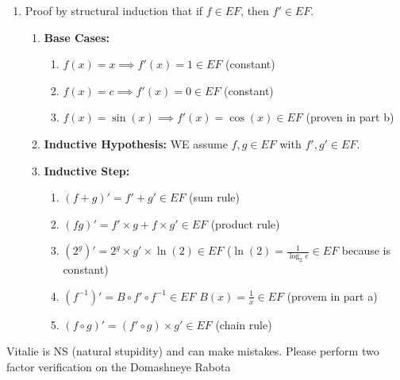 \documentclass[12pt]{article}
\begin{document}
\begin{enumerate}[label=\alph*)]
    \item Proof by structural induction that if \(f \in EF\), then \(f' \in EF\).
    \begin{enumerate}[label=\arabic*.]
        \item \textbf{Base Cases:}
        \begin{enumerate}[label=\roman*.]
            \item \(f(x) = x \implies f'(x) = 1 \in EF\) (constant)
            \item \(f(x) = c \implies f'(x) = 0 \in EF\) (constant)
            \item \(f(x) = \sin(x) \implies f'(x) = \cos(x) \in EF\) (proven in part b)
        \end{enumerate}
        \item \textbf{Inductive Hypothesis:} WE assume \(f, g \in EF\) with \(f', g' \in EF\).
        \item \textbf{Inductive Step:}
        \begin{enumerate}[label=\roman*.]
            \item \((f + g)' = f' + g' \in EF\) (sum rule)
            \item \((fg)' = f' \times g + f \times g' \in EF\) (product rule)
            \item \((2^g)' = 2^g \times g' \times \ln(2) \in EF\) (\(\ln(2) = \frac{1}{\log_2{e}} \in EF\) because is constant)
            \item \((f^{-1})' = B \circ f' \circ f^{-1} \in EF\)  \(B(x) = \frac{1}{x} \in EF\) (provem in part a)
            \item \((f \circ g)' = (f' \circ g) \times g' \in EF\) (chain rule)
        \end{enumerate}
    \end{enumerate}
\end{enumerate}

\vspace{54em}
\begin{center}
\fontsize{11}{9}\selectfont
Vitalie is NS (natural stupidity) and can make mistakes. Please perform two factor verification on the Domashneye Rabota
\end{center}
\end{document}
